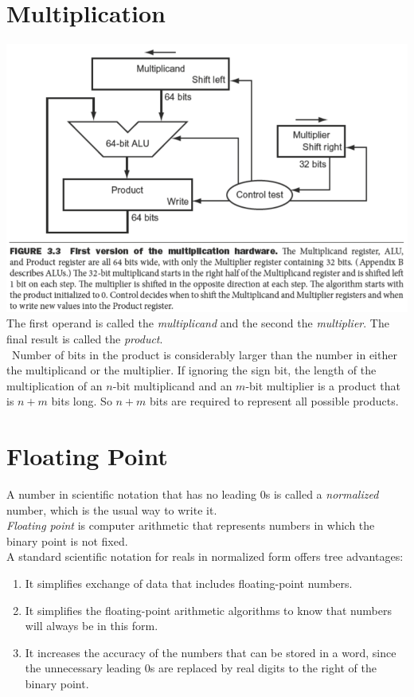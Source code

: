 \documentclass[12pt]{article}
\theoremstyle{definition}
\begin{document}
  \section{Multiplication}
  \includegraphics[width=1.0\textwidth]{pictures/multiplication.png} \\
  The first operand is called the \emph{multiplicand} and the second the \emph{multiplier}.
  The final result is called the \emph{product}. \\\
  Number of bits in the product is considerably larger than the number in either the multiplicand or the multiplier.
  If ignoring the sign bit, the length of the multiplication of an $n$-bit multiplicand and an $m$-bit multiplier is a product that is $n + m$ bits long.
  So $n + m$ bits are required to represent all possible products.

  \section{Floating Point}
  A number in scientific notation that has no leading 0s is called a \emph{normalized} number, which is the usual way to write it. \\
  \emph{Floating point} is computer arithmetic that represents numbers in which the binary point is not fixed. \\
  A standard scientific notation for reals in normalized form offers tree advantages:
  \begin{enumerate}
    \item It simplifies exchange of data that includes floating-point numbers.
    \item It simplifies the floating-point arithmetic algorithms to know that numbers will always be in this form.
    \item It increases the accuracy of the numbers that can be stored in a word, since the unnecessary leading 0s are replaced by real digits to the right of the binary point.
  \end{enumerate}
\end{document}
